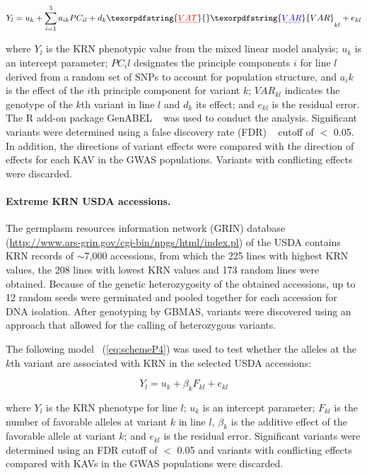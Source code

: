 \documentclass[10pt,letterpaper]{article}
\providecommand{\DIFaddtex}[1]{{\protect\color{blue}\uwave{#1}}} %
\providecommand{\DIFdeltex}[1]{{\protect\color{red}\sout{#1}}}                      %
\providecommand{\DIFaddbegin}{} %
\providecommand{\DIFaddend}{} %
\providecommand{\DIFdelbegin}{} %
\providecommand{\DIFdelend}{} %
\providecommand{\DIFadd}[1]{\texorpdfstring{\DIFaddtex{#1}}{#1}} %
\providecommand{\DIFdel}[1]{\texorpdfstring{\DIFdeltex{#1}}{}} %
\begin{document}
\begin{equation}\label{eq:schemeP3} 
Y_l = u_k + \sum_{i=1}^3 a_{ik}PC_{il} + d_k\DIFdelbegin \DIFdel{VAT}\DIFdelend \DIFaddbegin \DIFadd{VAR}\DIFaddend _{kl} + e_{kl}
\end{equation}

where $Y_l$ is the KRN phenotypic value from the mixed linear model analysis; $u_k$ is an intercept parameter; \DIFdelbegin \DIFdel{$PC_il$ }\DIFdelend \DIFaddbegin \DIFadd{$PC_{il}$ }\DIFaddend designates the principle components $i$ for line $l$ derived from a random set of SNPs to account for population structure, and \DIFdelbegin \DIFdel{$a_ik$ }\DIFdelend \DIFaddbegin \DIFadd{$a_{ik}$ }\DIFaddend is the effect of the $i$th principle component for variant $k$; $VAR_{kl}$ indicates the genotype of the $k$th variant in line $l$ and $d_k$ its effect; and $e_{kl}$ is the residual error. The R add-on package GenABEL ~\cite{Aulchenko2007} was used to conduct the analysis. Significant variants were determined using a false discovery rate (FDR) ~\cite{Benjamini1995} cutoff of $<$ 0.05. In addition, the directions of variant effects were compared with the direction of effects for each KAV in the GWAS populations. Variants with conflicting effects were discarded. 

\paragraph{Extreme KRN USDA accessions.}
The germplasm resources information network (GRIN) database (\url{http://www.ars-grin.gov/cgi-bin/npgs/html/index.pl}) of the USDA contains KRN records of $\sim$7,000 accessions, from which the 225 lines with highest KRN values, the 208 lines with lowest KRN values and 173 random lines were obtained. Because of the genetic heterozygosity of the obtained accessions, up to 12 random seeds were germinated and pooled together for each accession for DNA isolation. After genotyping by GBMAS, variants were discovered using an approach that allowed for the calling of heterozygous variants.

The following model ~(\ref{eq:schemeP4}) was used to test whether the alleles at the $k$th variant are associated with KRN in the selected USDA accessions:

\begin{equation}\label{eq:schemeP4} 
Y_l = u_k + \beta_k F_{kl} + e_{kl}
\end{equation}

where $Y_l$ is the KRN phenotype for line $l$; $u_k$ is an intercept parameter; $F_{kl}$ is the number of favorable alleles at variant $k$ in line $l$, $\beta_k$ is the additive effect of the favorable allele at variant $k$; and $e_{kl}$ is the residual error. Significant variants were determined using an FDR cutoff of $<$ 0.05 and variants with conflicting effects compared with KAVs in the GWAS populations were discarded.
%
\end{document}
